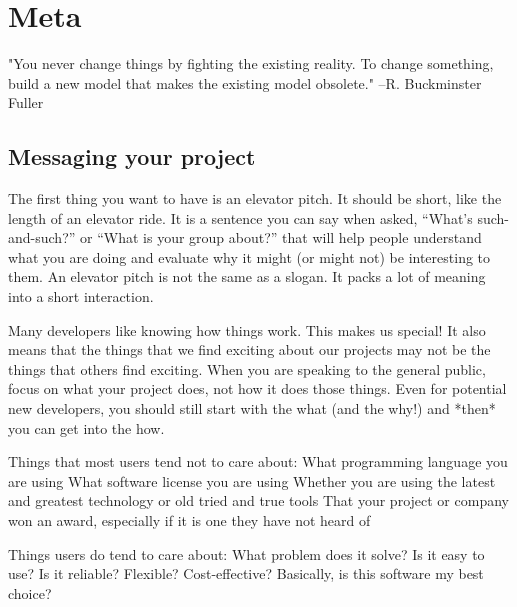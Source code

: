 \chapter{Meta}
"You never change things by fighting the existing reality. To change something, build a new model that makes the existing model obsolete." --R. Buckminster Fuller

\section{Messaging your project}
The first thing you want to have is an elevator pitch. It should be short, like the length of an elevator ride. It is a sentence you can say when asked, “What’s such-and-such?” or “What is your group about?” that will help people understand what you are doing and evaluate why it might (or might not) be interesting to them. An elevator pitch is not the same as a slogan. It packs a lot of meaning into a short interaction.  

Many developers like knowing how things work. This makes us special! It also means that the things that we find exciting about our projects may not be the things that others find exciting. When you are speaking to the general public, focus on what your project does, not how it does those things. Even for potential new developers, you should still start with the what (and the why!) and *then* you can get into the how.  

Things that most users tend not to care about:
What programming language you are using
What software license you are using
Whether you are using the latest and greatest technology or old tried and true tools
That your project or company won an award, especially if it is one they have not heard of

Things users do tend to care about:
What problem does it solve?
Is it easy to use?
Is it reliable? Flexible? Cost-effective?
Basically, is this software my best choice?


